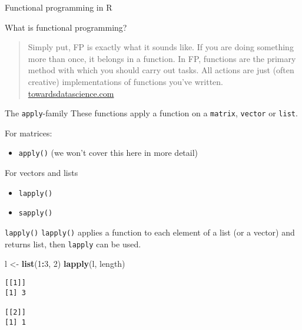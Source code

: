 \documentclass[ignorenonframetext,,t]{beamer}
\let\oldtextbf\textbf
\renewcommand{\textbf}[1]{\textcolor{spamwell}{\oldtextbf{#1}}}
\providecommand{\tightlist}{%
\setlength{\itemsep}{0pt}\setlength{\parskip}{0pt}}
\newenvironment{Shaded}{\begin{snugshade}}{\end{snugshade}}
\newcommand{\DecValTok}[1]{\textcolor[rgb]{0.00,0.00,0.81}{#1}}
\newcommand{\FunctionTok}[1]{\textcolor[rgb]{0.13,0.29,0.53}{\textbf{#1}}}
\newcommand{\NormalTok}[1]{#1}
\newcommand{\OtherTok}[1]{\textcolor[rgb]{0.56,0.35,0.01}{#1}}
\newcommand{\SpecialCharTok}[1]{\textcolor[rgb]{0.81,0.36,0.00}{\textbf{#1}}}
\providecommand{\tightlist}{%
\setlength{\itemsep}{0pt}\setlength{\parskip}{0pt}}
\renewcommand{\tightlist}{\setlength{\itemsep}{1.4ex}\setlength{\parskip}{0pt}}
\begin{document}
\begin{frame}{Functional programming in R}
\protect\hypertarget{functional-programming-in-r}{}
\begin{block}{What is functional programming?}
\protect\hypertarget{what-is-functional-programming}{}
\begin{quote}
Simply put, FP is exactly what it sounds like. If you are doing
something more than once, it belongs in a function. In FP, functions are
the primary method with which you should carry out tasks. All actions
are just (often creative) implementations of functions you've written.
\href{https://towardsdatascience.com/cleaner-r-code-with-functional-programming-adc37931ef7a}{towardsdatascience.com}
\end{quote}
\end{block}
\end{frame}

\begin{frame}[fragile]
\begin{block}{The \texttt{apply}-family}
\protect\hypertarget{the-apply-family}{}
These functions apply a function on a \texttt{matrix}, \texttt{vector}
or \texttt{list}.

For matrices:

\begin{itemize}
\tightlist
\item
  \texttt{apply()} (we won't cover this here in more detail)
\end{itemize}

For vectors and lists

\begin{itemize}
\tightlist
\item
  \texttt{lapply()}
\item
  \texttt{sapply()}
\end{itemize}
\end{block}
\end{frame}

\begin{frame}[fragile]
\begin{block}{\texttt{lapply()}}
\protect\hypertarget{lapply}{}
\texttt{lapply()} applies a function to each element of a list (or a
vector) and returns list, then \texttt{lapply} can be used.

\begin{Shaded}
\begin{Highlighting}[]
\NormalTok{l }\OtherTok{\textless{}{-}} \FunctionTok{list}\NormalTok{(}\DecValTok{1}\SpecialCharTok{:}\DecValTok{3}\NormalTok{, }\DecValTok{2}\NormalTok{)}
\FunctionTok{lapply}\NormalTok{(l, length)}
\end{Highlighting}
\end{Shaded}

\begin{verbatim}
[[1]]
[1] 3

[[2]]
[1] 1
\end{verbatim}
\end{block}
\end{frame}
\end{document}
